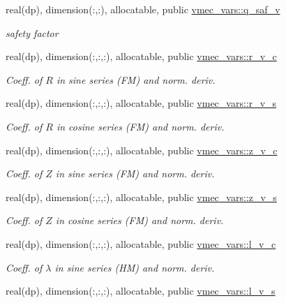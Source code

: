 \begin{DoxyCompactItemize}
real(dp), dimension(\+:,\+:), allocatable, public \hyperlink{namespacevmec__vars_a08f3862b0bb940623a416a056f03b092}{vmec\+\_\+vars\+::q\+\_\+saf\+\_\+v}
\begin{DoxyCompactList}\small\item\em safety factor \end{DoxyCompactList}\item 
real(dp), dimension(\+:,\+:,\+:), allocatable, public \hyperlink{namespacevmec__vars_a8307a4a411dadf5b9be24f8aafac5f39}{vmec\+\_\+vars\+::r\+\_\+v\+\_\+c}
\begin{DoxyCompactList}\small\item\em Coeff. of $R$ in sine series (FM) and norm. deriv. \end{DoxyCompactList}\item 
real(dp), dimension(\+:,\+:,\+:), allocatable, public \hyperlink{namespacevmec__vars_ac6cdafd632e37856533c42e8ab34a680}{vmec\+\_\+vars\+::r\+\_\+v\+\_\+s}
\begin{DoxyCompactList}\small\item\em Coeff. of $R$ in cosine series (FM) and norm. deriv. \end{DoxyCompactList}\item 
real(dp), dimension(\+:,\+:,\+:), allocatable, public \hyperlink{namespacevmec__vars_a66130a0eb0bc39ae0294f008f283efcd}{vmec\+\_\+vars\+::z\+\_\+v\+\_\+c}
\begin{DoxyCompactList}\small\item\em Coeff. of $Z$ in sine series (FM) and norm. deriv. \end{DoxyCompactList}\item 
real(dp), dimension(\+:,\+:,\+:), allocatable, public \hyperlink{namespacevmec__vars_ac6a5f1ccefd4c0337189c09166558bb1}{vmec\+\_\+vars\+::z\+\_\+v\+\_\+s}
\begin{DoxyCompactList}\small\item\em Coeff. of $Z$ in cosine series (FM) and norm. deriv. \end{DoxyCompactList}\item 
real(dp), dimension(\+:,\+:,\+:), allocatable, public \hyperlink{namespacevmec__vars_acf90dcedfaae39a8a6778fbf75a90a40}{vmec\+\_\+vars\+::l\+\_\+v\+\_\+c}
\begin{DoxyCompactList}\small\item\em Coeff. of $\lambda$ in sine series (HM) and norm. deriv. \end{DoxyCompactList}\item 
real(dp), dimension(\+:,\+:,\+:), allocatable, public \hyperlink{namespacevmec__vars_a5d1de7879021fa8c1d8c10bbef01f9c7}{vmec\+\_\+vars\+::l\+\_\+v\+\_\+s}

\end{DoxyCompactItemize}
